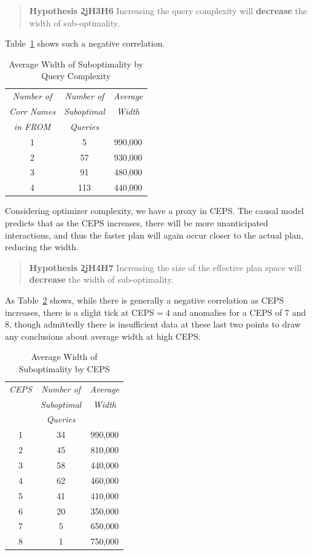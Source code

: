 \begin{quote}
{\bf Hypothesis \c2j{H3}{H6}} Increasing the query complexity will {\bf decrease}
the width of sub-optimality.
\end{quote}

Table~\ref{tab:widthfrom} shows such a negative correlation.

\begin{table}[t]
\begin{center}
\begin{tabular}{c|c|c}
{\em Number of} & {\em Number of} & {\em Average}\\
{\em Corr Names} & {\em Suboptimal} &{\em Width}\\
{\em in FROM} &{\em Queries} & \\
\hline
1 & 5 & 990,000\\
2 & 57 & 930,000\\
3 & 91 & 480,000\\
4 & 113 & 440,000\\
\end{tabular}
\end{center}
\caption{Average Width of Suboptimality by Query Complexity\label{tab:widthfrom}}
\end{table}

Considering optimizer complexity, we have a proxy in CEPS. The causal
model predicts that as the CEPS increases, there will be more
unanticipated interactions, and thus the faster plan will again occur closer
to the actual plan, reducing the width.

\begin{quote}
{\bf Hypothesis \c2j{H4}{H7}} Increasing the size of the effective plan space will
{\bf decrease} the width of sub-optimality.
\end{quote}

As Table~\ref{tab:widthceps} shows, while there is generally a negative
correlation as CEPS increases, there is a slight tick at CEPS${} = 4$ and
anomalies for a CEPS of 7 and 8, though admittedly there is insufficient
data at these last two points to draw any conclusions about average width at
high CEPS.

\begin{table}[t]
\begin{center}
\begin{tabular}{c|c|c}
{\em CEPS} & {\em Number of} & {\em Average}\\
& {\em Suboptimal} & {\em Width}\\
&{\em Queries} & \\
\hline
1 & 34 & 990,000\\
2 & 45 & 810,000\\
3 & 58 & 440,000\\
4 & 62 & 460,000\\
5 & 41 & 410,000\\
6 & 20 & 350,000\\
7 & 5 &  650,000\\
8 & 1 & 750,000\\
\end{tabular}
\end{center}
\caption{Average Width of Suboptimality by CEPS\label{tab:widthceps}}
\end{table}


